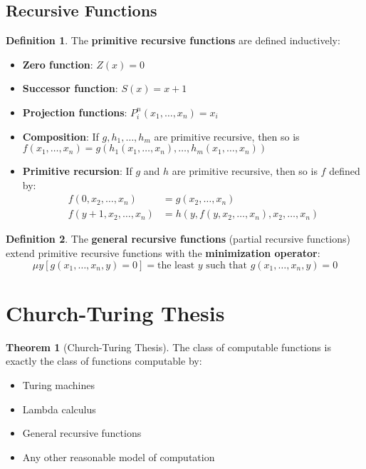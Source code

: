 \documentclass[11pt]{article}
\theoremstyle{definition}
\newtheorem{definition}{Definition}[section]
\newtheorem{theorem}{Theorem}[section]
\begin{document}
\subsection{Recursive Functions}
\begin{definition}
The \textbf{primitive recursive functions} are defined inductively:
\begin{itemize}
    \item \textbf{Zero function}: $Z(x) = 0$
    \item \textbf{Successor function}: $S(x) = x + 1$
    \item \textbf{Projection functions}: $P_i^n(x_1, \ldots, x_n) = x_i$
    \item \textbf{Composition}: If $g, h_1, \ldots, h_m$ are primitive recursive, then so is $f(x_1, \ldots, x_n) = g(h_1(x_1, \ldots, x_n), \ldots, h_m(x_1, \ldots, x_n))$
    \item \textbf{Primitive recursion}: If $g$ and $h$ are primitive recursive, then so is $f$ defined by:
    \begin{align}
    f(0, x_2, \ldots, x_n) &= g(x_2, \ldots, x_n) \\
    f(y+1, x_2, \ldots, x_n) &= h(y, f(y, x_2, \ldots, x_n), x_2, \ldots, x_n)
    \end{align}
\end{itemize}
\end{definition}

\begin{definition}
The \textbf{general recursive functions} (partial recursive functions) extend primitive recursive functions with the \textbf{minimization operator}:
$$\mu y[g(x_1, \ldots, x_n, y) = 0] = \text{the least } y \text{ such that } g(x_1, \ldots, x_n, y) = 0$$
\end{definition}

\section{Church-Turing Thesis}

\begin{theorem}[Church-Turing Thesis]
The class of computable functions is exactly the class of functions computable by:
\begin{itemize}
    \item Turing machines
    \item Lambda calculus
    \item General recursive functions
    \item Any other reasonable model of computation
\end{itemize}
\end{theorem}
\end{document}
